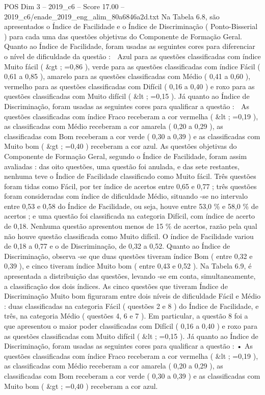\begin{textsample}{POS Dim 3 – 2019\_c6 – Score 17.00 – 2019\_c6/enade\_2019\_eng\_alim\_80a6846a2d.txt}
Na Tabela 6.8, são apresentados o Índice de Facilidade e o Índice de Discriminação ( Ponto-Bisserial ) para cada uma das questões objetivas do Componente de Formação Geral.
Quanto ao Índice de Facilidade, foram usadas as seguintes cores para diferenciar o nível de dificuldade da questão :  Azul para as questões classificadas com índice Muito fácil ( \&gt ; =0,86 ), verde para as questões classificadas com índice Fácil ( 0,61 a 0,85 ), amarelo para as questões classificadas com Médio ( 0,41 a 0,60 ), vermelho para as questões classificadas com Difícil ( 0,16 a 0,40 ) e roxo para as questões classificadas com Muito difícil ( \&lt ; =0,15 ).
Já quanto ao Índice de Discriminação, foram usadas as seguintes cores para qualificar a questão :  As questões classificadas com índice Fraco receberam a cor vermelha ( \&lt ; =0,19 ), as classificadas com Médio receberam a cor amarela ( 0,20 a 0,29 ), as classificadas com Bom receberam a cor verde ( 0,30 a 0,39 ) e as classificadas com Muito bom ( \&gt ; =0,40 ) receberam a cor azul.
As questões objetivas do Componente de Formação Geral, segundo o Índice de Facilidade, foram assim avaliadas : das oito questões, uma questão foi anulada, e das sete restantes, nenhuma teve o Índice de Facilidade classificado como Muito fácil.
Três questões foram tidas como Fácil, por ter índice de acertos entre 0,65 e 0,77 ; três questões foram consideradas com índice de dificuldade Médio, situando -se no intervalo entre 0,53 e 0,58 do Índice de Facilidade, ou seja, houve entre 53,0 \% e 58,0 \% de acertos ; e uma questão foi classificada na categoria Difícil, com índice de acerto de 0,18.
Nenhuma questão apresentou menos de 15 \% de acertos, razão pela qual não houve questão classificada como Muito difícil.
O índice de Facilidade variou de 0,18 a 0,77 e o de Discriminação, de 0,32 a 0,52.
Quanto ao Índice de Discriminação, observa -se que duas questões tiveram índice Bom ( entre 0,32 e 0,39 ), e cinco tiveram índice Muito bom ( entre 0,43 e 0,52 ).
Na Tabela 6.9, é apresentada a distribuição das questões, levando -se em conta, simultaneamente, a classificação dos dois índices.
As cinco questões que tiveram Índice de Discriminação Muito bom figuraram entre dois níveis de dificuldade Fácil e Médio : duas classificadas na categoria Fácil ( questões 2 e 8 ) do Índice de Facilidade, e três, na categoria Médio ( questões 4, 6 e 7 ).
Em particular, a questão 8 foi a que apresentou o maior poder classificadas com Difícil ( 0,16 a 0,40 ) e roxo para as questões classificadas com Muito difícil ( \&lt ; =0,15 ).
Já quanto ao Índice de Discriminação, foram usadas as seguintes cores para qualificar a questão : • As questões classificadas com índice Fraco receberam a cor vermelha ( \&lt ; =0,19 ), as classificadas com Médio receberam a cor amarela ( 0,20 a 0,29 ), as classificadas com Bom receberam a cor verde ( 0,30 a 0,39 ) e as classificadas com Muito bom ( \&gt ; =0,40 ) receberam a cor azul.

\end{textsample}
